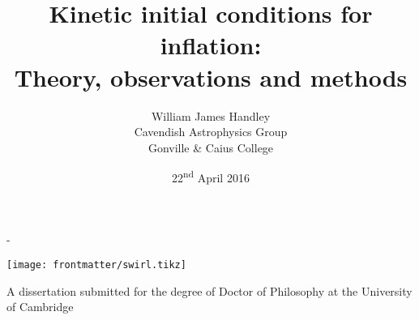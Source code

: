 \title{%
  {\Huge Kinetic initial conditions for inflation:}\\ 
  {\huge Theory, observations and methods}
}

\author{William James Handley\\
Cavendish Astrophysics Group \\
Gonville \& Caius College}
\date{22\textsuperscript{nd} April 2016}

\calccentering{\unitlength}                         %
\begin{adjustwidth*}{\unitlength}{-\unitlength}     %

  \begin{titlingpage}
    \maketitle
    \begin{center}
      \texttt{[image: frontmatter/swirl.tikz]}

      A dissertation submitted for the degree of Doctor of Philosophy
      at the University of Cambridge 
    \end{center}

  \end{titlingpage}

\end{adjustwidth*}

